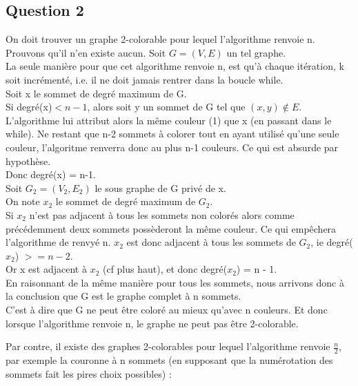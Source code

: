 \subsection{Question 2}\label{ex15_q2}
On doit trouver un graphe 2-colorable pour lequel l'algorithme renvoie n.\\
Prouvons qu'il n'en existe aucun.
Soit $G = (V,E)$ un tel graphe.\\
La seule mani\`ere pour que cet algorithme renvoie n, est qu'\`a chaque it\'eration, k
soit incr\'ement\'e, i.e. il ne doit jamais rentrer dans la boucle while.\\
Soit x le sommet de degr\'e maximum de G.\\
Si degr\'e(x)$ < n - 1$, alors soit y un sommet de G tel que $(x,y) \notin E$.
L'algorithme lui attribut alors la m\^eme couleur (1) que x (en passant dans le while).
Ne restant que n-2 sommets \`a colorer tout en ayant utilis\'e qu'une seule couleur,
l'algoritme renverra donc au plus n-1 couleurs. Ce qui est absurde par hypoth\`ese.\\
Donc degr\'e(x) = n-1.\\
Soit $G_2 = (V_2,E_2)$ le sous graphe de G priv\'e de x.\\
On note $x_2$ le sommet de degr\'e maximum de $G_2$.\\
Si $x_2$ n'est pas adjacent \`a tous les sommets non color\'es alors comme
pr\'ec\'edemment deux sommets poss\`ederont la m\^eme couleur. Ce qui emp\^echera
l'algorithme de renvy\'e n. $x_2$ est donc adjacent \`a tous les sommets de $G_2$, ie
degr\'e($x_2$) $>= n-2$.\\
Or x est adjacent \`a $x_2$ (cf plus haut), et donc degr\'e($x_2$) = n - 1.\\
En raisonnant de la m\^eme mani\`ere pour tous les sommets, nous arrivons donc \`a la
conclusion que G est le graphe complet \`a n sommets.\\
C'est \`a dire que G ne peut \^etre color\'e au mieux qu'avec n couleurs. Et donc lorsque
l'algorithme renvoie n, le graphe ne peut pas \^etre 2-colorable.

Par contre, il existe des graphes 2-colorables pour lequel l'algorithme renvoie
$\frac{n}{2}$, par exemple la couronne \`a n sommets (en supposant que la num\'erotation
des sommets fait les pires choix possibles) :



